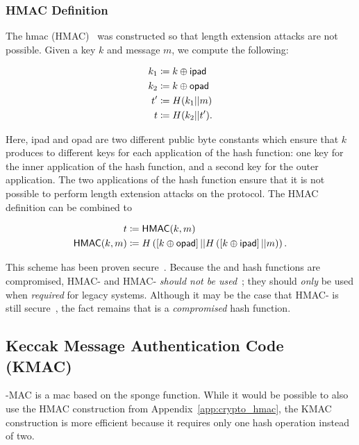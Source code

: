 \subsubsection{HMAC Definition}

The \gls{hmac} (HMAC)~\cite{HMAC1996,rfc2104}
was constructed so that length extension attacks are not possible.
Given a key $k$ and message $m$,
we compute the following:

\begin{align}
    k_{1} &\coloneqq{} k\oplus\textsf{ipad} \nonumber\\
    k_{2} &\coloneqq{} k\oplus\textsf{opad} \nonumber\\
    t' &\coloneqq{} H(k_{1}||m) \nonumber\\
    t &\coloneqq{} H(k_{2}||t').
\end{align}

\noindent
Here, \textsf{ipad} and \textsf{opad} are two different public
byte constants which ensure that $k$ produces to different
keys for each application of the \gls{hash function}:
one key for the inner application of the \gls{hash function},
and a second key for the outer application.
The two applications of the \gls{hash function} ensure that
it is not possible to perform length extension attacks on the protocol.
The HMAC definition can be combined to

\begin{align}
    t &\coloneqq{} \textsf{HMAC}(k, m) \nonumber\\
    \textsf{HMAC}(k, m) &\coloneqq{}
    H\left( \left[ k\oplus\textsf{opad} \right]||
        H\left( \left[ k\oplus\textsf{ipad} \right]||m \right) \right).
\end{align}

This scheme has been proven secure~\cite{cryptoeprint:2014:578}.
Because the \MDFive{} and \ShaOne{} \glspl{hash function} are compromised,
HMAC-\MDFive{} and HMAC-\ShaOne{}
\emph{should not be used}~\cite{cryptoeprint:2006:187,rfc6151};
they should \emph{only} be used when \emph{required} for legacy systems.
Although it may be the case that HMAC-\ShaOne{}
is still secure~\cite[Section 3.3]{rfc6194},
the fact remains that \ShaOne{} is a \emph{compromised} \gls{hash function}.


\subsection{Keccak Message Authentication Code (KMAC)}
\label{app:crypto_kmac}

\Keccak{}-MAC is a \gls{mac} based on the \Keccak{} sponge function.
While it would be possible to also use the HMAC construction
from Appendix~\ref{app:crypto_hmac}, the KMAC construction is more efficient
because it requires only one hash operation instead of two.

